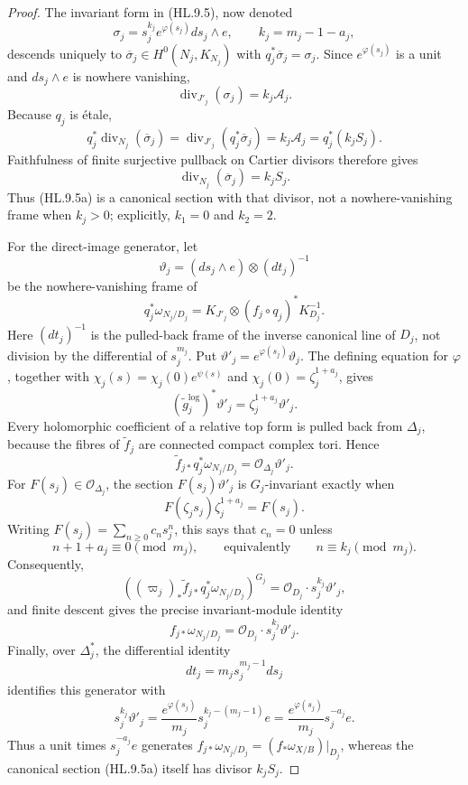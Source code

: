 \begin{proof}
The invariant form in (HL.9.5), now denoted
\[
 \sigma_j=s_j^{k_j}e^{\varphi(s_j)}ds_j\wedge e,
 \qquad k_j=m_j-1-a_j,
\tag{HL.9.5a}
\]
descends uniquely to
\(\overline\sigma_j\in H^0(N_j,K_{N_j})\) with
\(q_j^*\overline\sigma_j=\sigma_j\).  Since \(e^{\varphi(s_j)}\) is a
unit and \(ds_j\wedge e\) is nowhere vanishing,
\[
 \operatorname{div}_{J'_j}(\sigma_j)=k_j\mathcal A_j.
\]
Because \(q_j\) is \'etale,
\[
 q_j^*\operatorname{div}_{N_j}(\overline\sigma_j)
 =\operatorname{div}_{J'_j}(q_j^*\overline\sigma_j)
 =k_j\mathcal A_j=q_j^*(k_jS_j).
\]
Faithfulness of finite surjective pullback on Cartier divisors therefore gives
\[
 \operatorname{div}_{N_j}(\overline\sigma_j)=k_jS_j.
\tag{HL.9.5b}
\]
Thus (HL.9.5a) is a canonical section with that divisor, not a nowhere-vanishing
frame when \(k_j>0\); explicitly, \(k_1=0\) and \(k_2=2\).

For the direct-image generator, let
\[
 \vartheta_j=(ds_j\wedge e)\otimes(dt_j)^{-1}
\tag{HL.9.5c}
\]
be the nowhere-vanishing frame of
\[
 q_j^*\omega_{N_j/D_j}
 =K_{J'_j}\otimes(f_j\circ q_j)^*K_{D_j}^{-1}.
\]
Here \((dt_j)^{-1}\) is the pulled-back frame of the inverse canonical line
of \(D_j\), not division by the differential of \(s_j^{m_j}\).  Put
\(\vartheta'_j=e^{\varphi(s_j)}\vartheta_j\).  The defining equation for
\(\varphi\), together with
\(\chi_j(s)=\chi_j(0)e^{\psi(s)}\) and
\(\chi_j(0)=\zeta_j^{1+a_j}\), gives
\[
 (\widetilde g_j^{\log})^*\vartheta'_j
 =\zeta_j^{1+a_j}\vartheta'_j.
\tag{HL.9.5d}
\]
Every holomorphic coefficient of a relative top form is pulled back from
\(\Delta_j\), because the fibres of \(\widetilde f_j\) are connected compact
complex tori.  Hence
\[
 \widetilde f_{j*}q_j^*\omega_{N_j/D_j}
 =\mathcal O_{\Delta_j}\vartheta'_j.
\]
For \(F(s_j)\in\mathcal O_{\Delta_j}\), the section
\(F(s_j)\vartheta'_j\) is \(G_j\)-invariant exactly when
\[
 F(\zeta_js_j)\zeta_j^{1+a_j}=F(s_j).
\tag{HL.9.5e}
\]
Writing \(F(s_j)=\sum_{n\ge0}c_ns_j^n\), this says that \(c_n=0\) unless
\[
 n+1+a_j\equiv0\pmod {m_j},
 \qquad\text{equivalently}\qquad n\equiv k_j\pmod {m_j}.
\]
Consequently,
\[
 \left((\varpi_j)_*\widetilde f_{j*}
 q_j^*\omega_{N_j/D_j}\right)^{G_j}
 =\mathcal O_{D_j}\cdot s_j^{k_j}\vartheta'_j,
\]
and finite descent gives the precise invariant-module identity
\[
 f_{j*}\omega_{N_j/D_j}
 =\mathcal O_{D_j}\cdot s_j^{k_j}\vartheta'_j.
\tag{HL.9.5f}
\]
Finally, over \(\Delta_j^*\), the differential identity
\[
 dt_j=m_js_j^{m_j-1}ds_j
\]
identifies this generator with
\[
 s_j^{k_j}\vartheta'_j
 =\frac{e^{\varphi(s_j)}}{m_j}
 s_j^{k_j-(m_j-1)}e
 =\frac{e^{\varphi(s_j)}}{m_j}s_j^{-a_j}e.
\tag{HL.9.5g}
\]
Thus a unit times \(s_j^{-a_j}e\) generates
\(f_{j*}\omega_{N_j/D_j}=(f_*\omega_{X/B})|_{D_j}\), whereas the
canonical section (HL.9.5a) itself has divisor \(k_jS_j\).


\end{proof}
